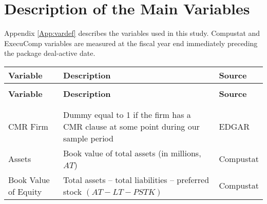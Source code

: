 \section{Description of the Main Variables}
\label{App:vardef}
\vspace{-1em}
\bgroup
\singlespacing

Appendix \ref{App:vardef} describes the variables used in this study.
Compustat and ExecuComp variables are measured at the fiscal year end immediately preceding the package deal-active date.

\begin{center}
	\centering
    \footnotesize
	\begin{longtable*}{>{\raggedright\let\newline\\\arraybackslash\hspace{0pt}}p{.2 \textwidth} >{\raggedright\let\newline\\\arraybackslash\hspace{0pt}}p{.55 \textwidth} >{\raggedright\let\newline\\\arraybackslash\hspace{0pt}}p{.15 \textwidth}}
        \toprule
		\textbf{Variable} 	& \textbf{Description} & \textbf{Source} \\ \midrule
		\endfirsthead
		 \\
		\toprule
		\textbf{Variable} 	& \textbf{Description} & \textbf{Source} \\ \midrule
		\endhead
		\midrule
		 \\
		\endfoot
		\bottomrule
		\endlastfoot
         \\ \addlinespace
CMR Firm                                & Dummy equal to 1 if the firm has a CMR clause at some point during our sample period                                                                   & EDGAR                        \\
Assets                                  & Book value of total assets (in millions, $ AT $)                                                                                                                           & Compustat                    \\
Book Value of Equity                    & Total assets – total liabilities – preferred stock $(AT-LT-PSTK)$                                                                                               & Compustat                    \\

\end{longtable*}
\end{center}
